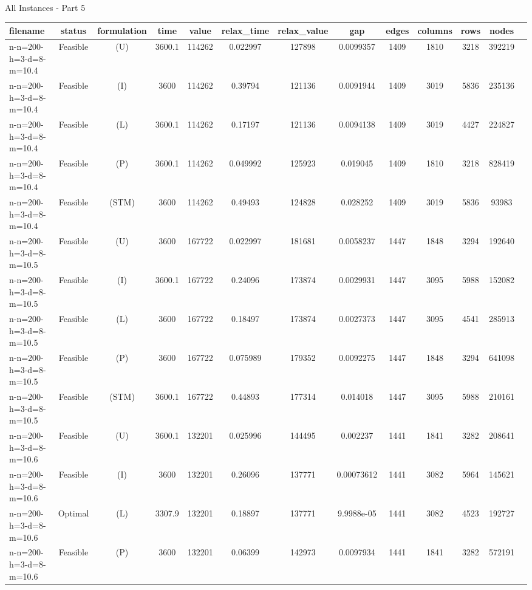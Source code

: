 \documentclass[landscape, a4paper]{article}
\newcommand{\STM}{\ensuremath{\mathrm{STM}}}
\newcommand{\Improved}{\ensuremath{\mathrm{I}}}
\newcommand{\Loose}{\ensuremath{\mathrm{L}}}
\newcommand{\Profit}{\ensuremath{\mathrm{P}}}
\newcommand{\Utility}{\ensuremath{\mathrm{U}}}
\begin{document}
\begin{center}
\newpage
All Instances - Part 5

\begin{tabular}{lcccccccccccc}
filename & status & formulation & time & value & relax\_time & relax\_value & gap & edges & columns & rows & nodes & \\
\hline
n-n=200-h=3-d=8-m=10.4 & Feasible & (\Utility) & 3600.1 & 114262 & 0.022997 & 127898 & 0.0099357 & 1409 & 1810 & 3218 & 392219 & \\
n-n=200-h=3-d=8-m=10.4 & Feasible & (\Improved) & 3600 & 114262 & 0.39794 & 121136 & 0.0091944 & 1409 & 3019 & 5836 & 235136 & \\
n-n=200-h=3-d=8-m=10.4 & Feasible & (\Loose) & 3600.1 & 114262 & 0.17197 & 121136 & 0.0094138 & 1409 & 3019 & 4427 & 224827 & \\
n-n=200-h=3-d=8-m=10.4 & Feasible & (\Profit) & 3600.1 & 114262 & 0.049992 & 125923 & 0.019045 & 1409 & 1810 & 3218 & 828419 & \\
n-n=200-h=3-d=8-m=10.4 & Feasible & (\STM) & 3600 & 114262 & 0.49493 & 124828 & 0.028252 & 1409 & 3019 & 5836 & 93983 & \\
n-n=200-h=3-d=8-m=10.5 & Feasible & (\Utility) & 3600 & 167722 & 0.022997 & 181681 & 0.0058237 & 1447 & 1848 & 3294 & 192640 & \\
n-n=200-h=3-d=8-m=10.5 & Feasible & (\Improved) & 3600.1 & 167722 & 0.24096 & 173874 & 0.0029931 & 1447 & 3095 & 5988 & 152082 & \\
n-n=200-h=3-d=8-m=10.5 & Feasible & (\Loose) & 3600 & 167722 & 0.18497 & 173874 & 0.0027373 & 1447 & 3095 & 4541 & 285913 & \\
n-n=200-h=3-d=8-m=10.5 & Feasible & (\Profit) & 3600 & 167722 & 0.075989 & 179352 & 0.0092275 & 1447 & 1848 & 3294 & 641098 & \\
n-n=200-h=3-d=8-m=10.5 & Feasible & (\STM) & 3600.1 & 167722 & 0.44893 & 177314 & 0.014018 & 1447 & 3095 & 5988 & 210161 & \\
n-n=200-h=3-d=8-m=10.6 & Feasible & (\Utility) & 3600.1 & 132201 & 0.025996 & 144495 & 0.002237 & 1441 & 1841 & 3282 & 208641 & \\
n-n=200-h=3-d=8-m=10.6 & Feasible & (\Improved) & 3600 & 132201 & 0.26096 & 137771 & 0.00073612 & 1441 & 3082 & 5964 & 145621 & \\
n-n=200-h=3-d=8-m=10.6 & Optimal & (\Loose) & 3307.9 & 132201 & 0.18897 & 137771 & 9.9988e-05 & 1441 & 3082 & 4523 & 192727 & \\
n-n=200-h=3-d=8-m=10.6 & Feasible & (\Profit) & 3600 & 132201 & 0.06399 & 142973 & 0.0097934 & 1441 & 1841 & 3282 & 572191 & \\

\end{tabular}
\end{center}
\end{document}
